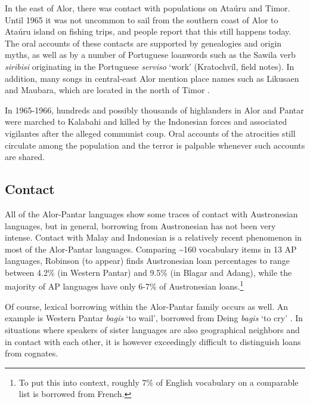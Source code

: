 In the east of Alor, there was contact with populations on Ata\'uru and Timor. Until 1965 it was not uncommon to sail from the southern coast of Alor to Ata\'uru island on fishing trips, and people report that this still happens today. The oral accounts of these contacts are supported by genealogies and origin myths, as well as by a number of Portuguese loanwords such as the Sawila verb \textit{siribisi} originating in the Portuguese \textit{serviso} `work' (Kratochv\'il, field notes). In addition, many songs in central-east Alor mention place names such as Likusaen and Maubara, which are located in the north of Timor \citep{WellfeltEtAl2013}.

In 1965-1966, hundreds and possibly thousands of highlanders in Alor and Pantar were marched to Kalabahi and killed by the Indonesian forces and associated vigilantes after the alleged communist coup. Oral accounts of the atrocities still circulate among the population and the terror is palpable whenever such accounts are shared.

\subsection{Contact}\label{sec:1:4.3}
All of the Alor-Pantar languages show some traces of contact with Austronesian languages, but in general, borrowing from Austronesian has not been very intense. Contact with Malay and Indonesian is a relatively recent phenomenon in most of the Alor-Pantar languages. Comparing \~{}160 vocabulary items in 13 AP languages, Robinson (to appear) finds Austronesian loan percentages to range between 4.2\% (in Western Pantar) and 9.5\% (in Blagar and Adang), while the majority of AP languages have only 6-7\% of Austronesian loans.\footnote{To put this into context,  roughly 7\% of English vocabulary on a comparable list is borrowed from French. 
}

Of course, lexical borrowing within the Alor-Pantar family occurs as well. An example is Western Pantar \textit{bagis} `to wail', borrowed from Deing \textit{bagis} `to cry' \citep{HoltonRobinsonTV}. In situations where speakers of sister languages are also geographical neighbors and in contact with each other, it is however exceedingly difficult to distinguish loans from cognates.

